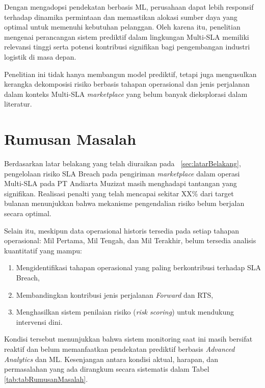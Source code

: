 Dengan mengadopsi pendekatan berbasis ML, perusahaan dapat lebih responsif terhadap dinamika permintaan dan memastikan alokasi sumber daya yang optimal untuk memenuhi kebutuhan pelanggan. Oleh karena itu, penelitian mengenai perancangan sistem prediktif dalam lingkungan Multi-SLA memiliki relevansi tinggi serta potensi kontribusi signifikan bagi pengembangan industri logistik di masa depan.

Penelitian ini tidak hanya membangun model prediktif, tetapi juga mengusulkan kerangka dekomposisi risiko berbasis tahapan operasional dan jenis perjalanan dalam konteks Multi-SLA \textit{marketplace} yang belum banyak dieksplorasi dalam literatur.
\section{Rumusan Masalah}
\label{sec:rumusanMasalah}

Berdasarkan latar belakang yang telah diuraikan pada \sect~\ref{sec:latarBelakang}, pengelolaan risiko SLA Breach pada pengiriman \textit{marketplace} dalam operasi Multi-SLA pada PT Andiarta Muzizat masih menghadapi tantangan yang signifikan. Realisasi penalti yang telah mencapai sekitar XX\% dari target bulanan menunjukkan bahwa mekanisme pengendalian risiko belum berjalan secara optimal.

Selain itu, meskipun data operasional historis tersedia pada setiap tahapan operasional: Mil Pertama, Mil Tengah, dan Mil Terakhir, belum tersedia analisis kuantitatif yang mampu:
\begin{enumerate}
    \item Mengidentifikasi tahapan operasional yang paling berkontribusi terhadap SLA Breach,
    \item Membandingkan kontribusi jenis perjalanan \textit{Forward} dan RTS,
    \item Menghasilkan sistem penilaian risiko (\textit{risk scoring}) untuk mendukung intervensi dini.
\end{enumerate}

Kondisi tersebut menunjukkan bahwa sistem monitoring saat ini masih bersifat reaktif dan belum memanfaatkan pendekatan prediktif berbasis \textit{Advanced Analytics} dan ML. Kesenjangan antara kondisi aktual, harapan, dan permasalahan yang ada dirangkum secara sistematis dalam Tabel \ref{tab:tabRumusanMasalah}.

